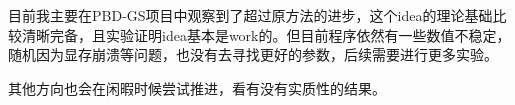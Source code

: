 目前我主要在PBD-GS项目中观察到了超过原方法的进步，这个idea的理论基础比较清晰完备，且实验证明idea基本是work的。但目前程序依然有一些数值不稳定，随机因为显存崩溃等问题，也没有去寻找更好的参数，后续需要进行更多实验。

其他方向也会在闲暇时候尝试推进，看有没有实质性的结果。